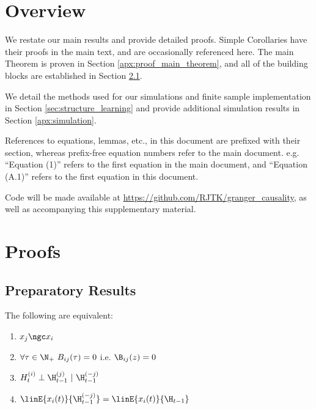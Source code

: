 
\section{Overview}
We restate our main results and provide detailed proofs.  Simple
Corollaries have their proofs in the main text, and are occasionally
referenced here.  The main Theorem is proven in Section
\ref{apx:proof_main_theorem}, and all of the building blocks are
established in Section \ref{apx:ancillary_results}.

We detail the methods used for our simulations and finite sample
implementation in Section \ref{sec:structure_learning} and provide
additional simulation results in Section \ref{apx:simulation}.

References to equations, lemmas, etc., in this document are prefixed
with their section, whereas prefix-free equation numbers refer to the
main document.  e.g. ``Equation (1)'' refers to the first equation in
the main document, and ``Equation (A.1)'' refers to the first equation
in this document.

Code will be made available at
\url{https://github.com/RJTK/granger_causality}, as well as
accompanying this supplementary material.

\section{Proofs}
\subsection{Preparatory Results}
\label{apx:ancillary_results}
\begin{theorem}
  The following are equivalent:

  \begin{enumerate}
  \item{$x_j \ngc x_i$}
  \item{$\forall \tau \in \N_+\ B_{ij}(\tau) = 0$ i.e. $\B_{ij}(z) = 0$}
  \item{$H_t^{(i)} \perp \H_{t - 1}^{(j)}\ |\ \H_{t - 1}^{(-j)}$}
  \item{$\linE{x_i(t)}{\H_{t - 1}^{(-j)}} = \linE{x_i(t)}{\H_{t - 1}}$}
  \end{enumerate}
\end{theorem}

